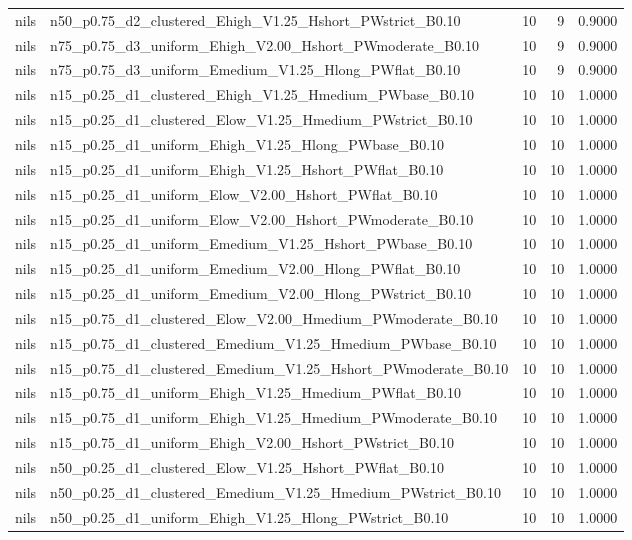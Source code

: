 \begin{tabular}{llrrr}
nils & n50_p0.75_d2_clustered_Ehigh_V1.25_Hshort_PWstrict_B0.10 & 10 & 9 & 0.9000 \\
nils & n75_p0.75_d3_uniform_Ehigh_V2.00_Hshort_PWmoderate_B0.10 & 10 & 9 & 0.9000 \\
nils & n75_p0.75_d3_uniform_Emedium_V1.25_Hlong_PWflat_B0.10 & 10 & 9 & 0.9000 \\
nils & n15_p0.25_d1_clustered_Ehigh_V1.25_Hmedium_PWbase_B0.10 & 10 & 10 & 1.0000 \\
nils & n15_p0.25_d1_clustered_Elow_V1.25_Hmedium_PWstrict_B0.10 & 10 & 10 & 1.0000 \\
nils & n15_p0.25_d1_uniform_Ehigh_V1.25_Hlong_PWbase_B0.10 & 10 & 10 & 1.0000 \\
nils & n15_p0.25_d1_uniform_Ehigh_V1.25_Hshort_PWflat_B0.10 & 10 & 10 & 1.0000 \\
nils & n15_p0.25_d1_uniform_Elow_V2.00_Hshort_PWflat_B0.10 & 10 & 10 & 1.0000 \\
nils & n15_p0.25_d1_uniform_Elow_V2.00_Hshort_PWmoderate_B0.10 & 10 & 10 & 1.0000 \\
nils & n15_p0.25_d1_uniform_Emedium_V1.25_Hshort_PWbase_B0.10 & 10 & 10 & 1.0000 \\
nils & n15_p0.25_d1_uniform_Emedium_V2.00_Hlong_PWflat_B0.10 & 10 & 10 & 1.0000 \\
nils & n15_p0.25_d1_uniform_Emedium_V2.00_Hlong_PWstrict_B0.10 & 10 & 10 & 1.0000 \\
nils & n15_p0.75_d1_clustered_Elow_V2.00_Hmedium_PWmoderate_B0.10 & 10 & 10 & 1.0000 \\
nils & n15_p0.75_d1_clustered_Emedium_V1.25_Hmedium_PWbase_B0.10 & 10 & 10 & 1.0000 \\
nils & n15_p0.75_d1_clustered_Emedium_V1.25_Hshort_PWmoderate_B0.10 & 10 & 10 & 1.0000 \\
nils & n15_p0.75_d1_uniform_Ehigh_V1.25_Hmedium_PWflat_B0.10 & 10 & 10 & 1.0000 \\
nils & n15_p0.75_d1_uniform_Ehigh_V1.25_Hmedium_PWmoderate_B0.10 & 10 & 10 & 1.0000 \\
nils & n15_p0.75_d1_uniform_Ehigh_V2.00_Hshort_PWstrict_B0.10 & 10 & 10 & 1.0000 \\
nils & n50_p0.25_d1_clustered_Elow_V1.25_Hshort_PWflat_B0.10 & 10 & 10 & 1.0000 \\
nils & n50_p0.25_d1_clustered_Emedium_V1.25_Hmedium_PWstrict_B0.10 & 10 & 10 & 1.0000 \\
nils & n50_p0.25_d1_uniform_Ehigh_V1.25_Hlong_PWstrict_B0.10 & 10 & 10 & 1.0000 \\

\end{tabular}
